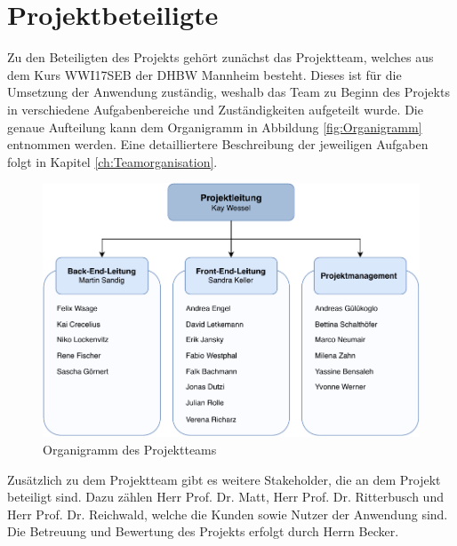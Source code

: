 \section{Projektbeteiligte}
Zu den Beteiligten des Projekts gehört zunächst das Projektteam, welches aus dem Kurs WWI17SEB der DHBW Mannheim besteht.
Dieses ist für die Umsetzung der Anwendung zuständig, weshalb das Team zu Beginn des Projekts in verschiedene Aufgabenbereiche und Zuständigkeiten aufgeteilt wurde.
Die genaue Aufteilung kann dem Organigramm in Abbildung \vref{fig:Organigramm} entnommen werden.
Eine detailliertere Beschreibung der jeweiligen Aufgaben folgt in Kapitel \vref{ch:Teamorganisation}. 

\begin{figure}[h]
	\centering 
	\includegraphics[width=12cm]{img/Organigramm.pdf}
	\captionsetup{format=hang}
	\caption[Organigramm des Projektteams]{\label{fig:Organigramm}Organigramm des Projektteams}
\end{figure}

Zusätzlich zu dem Projektteam gibt es weitere Stakeholder, die an dem Projekt beteiligt sind.
Dazu zählen Herr Prof. Dr. Matt, Herr Prof. Dr. Ritterbusch und Herr Prof. Dr. Reichwald, welche die Kunden sowie Nutzer der Anwendung sind.
Die Betreuung und Bewertung des Projekts erfolgt durch Herrn Becker.



 
